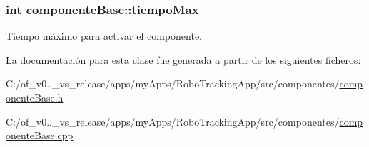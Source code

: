 \hypertarget{classcomponente_base_a0edb9230fa502947fd80006463f9ce25}{}
\subsubsection[{tiempo\+Max}]{\setlength{\rightskip}{0pt plus 5cm}int componente\+Base\+::tiempo\+Max\hspace{0.3cm}{\ttfamily [protected]}}\label{classcomponente_base_a0edb9230fa502947fd80006463f9ce25}


Tiempo máximo para activar el componente. 



La documentación para esta clase fue generada a partir de los siguientes ficheros\+:\begin{DoxyCompactItemize}
\item 
C\+:/of\+\_\+v0..\+\_\+vs\+\_\+release/apps/my\+Apps/\+Robo\+Tracking\+App/src/componentes/\hyperlink{componente_base_8h}{componente\+Base.\+h}\item 
C\+:/of\+\_\+v0..\+\_\+vs\+\_\+release/apps/my\+Apps/\+Robo\+Tracking\+App/src/componentes/\hyperlink{componente_base_8cpp}{componente\+Base.\+cpp}\end{DoxyCompactItemize}

